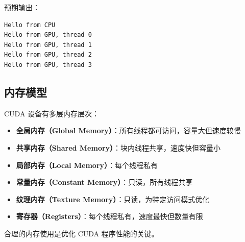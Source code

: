 预期输出：
\begin{verbatim}
Hello from CPU
Hello from GPU, thread 0
Hello from GPU, thread 1
Hello from GPU, thread 2
Hello from GPU, thread 3
\end{verbatim}

\subsection{内存模型}

CUDA 设备有多层内存层次：
\begin{itemize}
    \item \textbf{全局内存（Global Memory）}：所有线程都可访问，容量大但速度较慢
    \item \textbf{共享内存（Shared Memory）}：块内线程共享，速度快但容量小
    \item \textbf{局部内存（Local Memory）}：每个线程私有
    \item \textbf{常量内存（Constant Memory）}：只读，所有线程共享
    \item \textbf{纹理内存（Texture Memory）}：只读，为特定访问模式优化
    \item \textbf{寄存器（Registers）}：每个线程私有，速度最快但数量有限
\end{itemize}

合理的内存使用是优化 CUDA 程序性能的关键。
